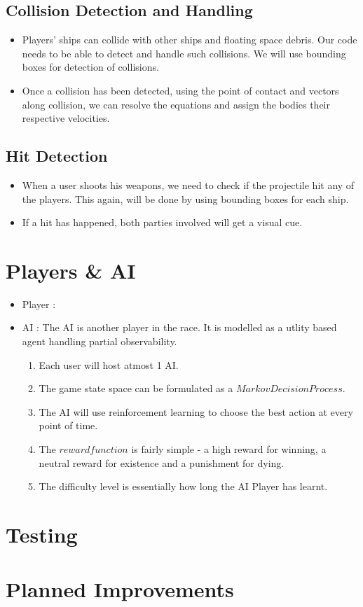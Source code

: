 \documentclass[]{article}
\begin{document}
\subsection{Collision Detection and Handling}
\begin{itemize}
\item Players' ships can collide with other ships and floating space debris. Our code needs to be able to detect and handle such collisions. We will use bounding boxes for detection of collisions.
\item Once a collision has been detected, using the point of contact and vectors along collision, we can resolve the equations and assign the bodies their respective velocities.
\end{itemize}
\subsection{Hit Detection}
\begin{itemize}

\item When a user shoots his weapons, we need to check if the projectile hit any of the players. This again, will be done by using bounding boxes for each ship.
\item If a hit has happened, both parties involved will get a visual cue.
\end{itemize}
\section{Players \& AI}
\begin{itemize}
\item Player : 

\item AI : The AI is another player in the race. It is modelled as a utlity based agent handling partial observability. 
\begin{enumerate}
\item Each user will host atmost 1 AI. 
\item The game state space can be formulated as a $Markov Decision Process$. 
\item The AI will use reinforcement learning to choose the best action at every point of time. 
\item The $reward function$ is fairly simple - a high reward for winning, a neutral reward for existence and a punishment for dying.
\item The difficulty level is essentially how long the AI Player has learnt.
\end{enumerate} 
\end{itemize}
\section{Testing}
\section{Planned Improvements}
\end{document}
